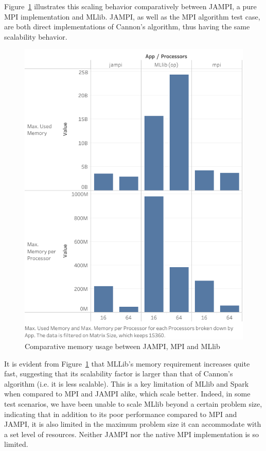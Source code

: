 \documentclass[fleqn,10pt]{SelfArx} %
\begin{document}
Figure~\ref{fig:memory_usage} illustrates this scaling behavior comparatively between JAMPI, a pure MPI implementation and MLlib. JAMPI, as well as the MPI algorithm test case, are both direct implementations of Cannon's algorithm, thus having the same scalability behavior. 

\begin{figure}
	\centering
	\includegraphics[width=0.9\linewidth]{figures/memory.png}
	\vspace{14pt}
	\caption{Comparative memory usage between JAMPI, MPI and MLlib}
	\label{fig:memory_usage}
\end{figure}

It is evident from Figure~\ref{fig:memory_usage} that MLLib's memory requirement increases quite fast, suggesting that its scalability factor is larger than that of Cannon's algorithm (i.e. it is less scalable). This is a key limitation of MLlib and Spark when compared to MPI and JAMPI alike, which scale better. Indeed, in some test scenarios, we have been unable to scale MLlib beyond a certain problem size, indicating that in addition to its poor performance compared to MPI and JAMPI, it is also limited in the maximum problem size it can accommodate with a set level of resources. Neither JAMPI nor the native MPI implementation is so limited.
\end{document}
